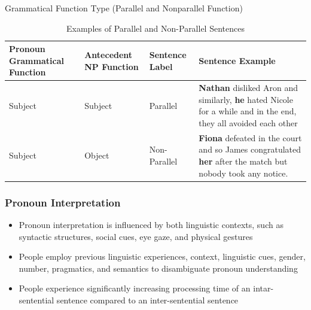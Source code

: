 \documentclass{beamer}
\begin{document}
\begin{frame}{Grammatical Function Type (Parallel and Nonparallel Function)}
    \begin{table}[]
        \centering\small
        \begin{tabular}{p{1.5cm}p{1.5cm}p{1cm}p{5.5cm}}
        \hline\hline
            Pronoun Grammatical Function & Antecedent NP Function & Sentence Label & Sentence Example \\\hline
            Subject & Subject & Parallel & \textbf{Nathan} disliked Aron and similarly, \textbf{he} hated Nicole for a while and in the end, they all avoided each other\\
            Subject&Object&Non-Parallel&
            \textbf{Fiona} defeated in the court and so James congratulated \textbf{her} after the match but nobody took any notice.
          \\\hline\hline
        \end{tabular}
        \caption{Examples of Parallel and Non-Parallel Sentences}
        \label{Table: Examples of Parallel and Non-Parallel Sentences}
    \end{table}
\end{frame}

\begin{frame}
\frametitle{Pronoun Interpretation}
\begin{itemize}
\item Pronoun interpretation is influenced by both linguistic contexts, such as syntactic structures, social cues, eye gaze, and physical gestures  \cite{arnold2015effects} \cite{chien1990children}
\item People employ previous linguistic experiences, context, linguistic cues, gender, number, pragmatics, and semantics to disambiguate pronoun understanding \cite{sorlin2015pragmatics}\cite{oshima1988children}
\item People experience significantly increasing processing time of an intar-sentential sentence compared to an inter-sentential sentence \cite{brennan1987centering}

\end{itemize}
\end{frame}
\end{document}
